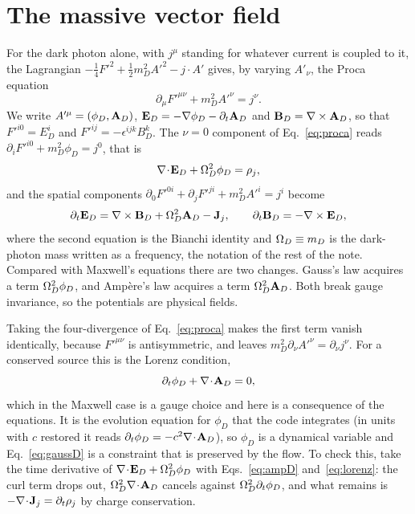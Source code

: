 \section{The massive vector field}\label{sec:proca}

For the dark photon alone, with $j^\mu$ standing for whatever current is coupled to it, the Lagrangian $-\tfrac14F'^2+\tfrac12m_D^2A'^2-j\cdot A'$ gives, by varying $A'_\nu$, the Proca equation
\begin{equation}
\partial_\mu F'^{\mu\nu}+m_D^2A'^\nu=j^\nu .\label{eq:proca}
\end{equation}
We write $A'^\mu=(\phi_D,\mathbf A_D)$, $\mathbf E_D=-\nabla\phi_D-\partial_t\mathbf A_D$ and $\mathbf B_D=\nabla\times\mathbf A_D$, so that $F'^{i0}=E_D^i$ and $F'^{ij}=-\epsilon^{ijk}B_D^k$. The $\nu=0$ component of Eq.~\eqref{eq:proca} reads $\partial_iF'^{i0}+m_D^2\phi_D=j^0$, that is
\begin{equation}
\nabla\!\cdot\!\mathbf E_D+\Omega_D^2\phi_D=\rho_j ,\label{eq:gaussD}
\end{equation}
and the spatial components $\partial_0F'^{0i}+\partial_jF'^{ji}+m_D^2A'^i=j^i$ become
\begin{equation}
\partial_t\mathbf E_D=\nabla\times\mathbf B_D+\Omega_D^2\mathbf A_D-\mathbf J_j ,\qquad \partial_t\mathbf B_D=-\nabla\times\mathbf E_D ,\label{eq:ampD}
\end{equation}
where the second equation is the Bianchi identity and $\Omega_D\equiv m_D$ is the dark-photon mass written as a frequency, the notation of the rest of the note. Compared with Maxwell's equations there are two changes. Gauss's law acquires a term $\Omega_D^2\phi_D$, and Amp\`ere's law acquires a term $\Omega_D^2\mathbf A_D$. Both break gauge invariance, so the potentials are physical fields.

Taking the four-divergence of Eq.~\eqref{eq:proca} makes the first term vanish identically, because $F'^{\mu\nu}$ is antisymmetric, and leaves $m_D^2\partial_\nu A'^\nu=\partial_\nu j^\nu$. For a conserved source this is the Lorenz condition,
\begin{equation}
\partial_t\phi_D+\nabla\!\cdot\!\mathbf A_D=0 ,\label{eq:lorenz}
\end{equation}
which in the Maxwell case is a gauge choice and here is a consequence of the equations. It is the evolution equation for $\phi_D$ that the code integrates (in units with $c$ restored it reads $\partial_t\phi_D=-c^2\nabla\!\cdot\!\mathbf A_D$), so $\phi_D$ is a dynamical variable and Eq.~\eqref{eq:gaussD} is a constraint that is preserved by the flow. To check this, take the time derivative of $\nabla\!\cdot\!\mathbf E_D+\Omega_D^2\phi_D$ with Eqs.~\eqref{eq:ampD} and~\eqref{eq:lorenz}: the curl term drops out, $\Omega_D^2\nabla\!\cdot\!\mathbf A_D$ cancels against $\Omega_D^2\partial_t\phi_D$, and what remains is $-\nabla\!\cdot\!\mathbf J_j=\partial_t\rho_j$ by charge conservation.

